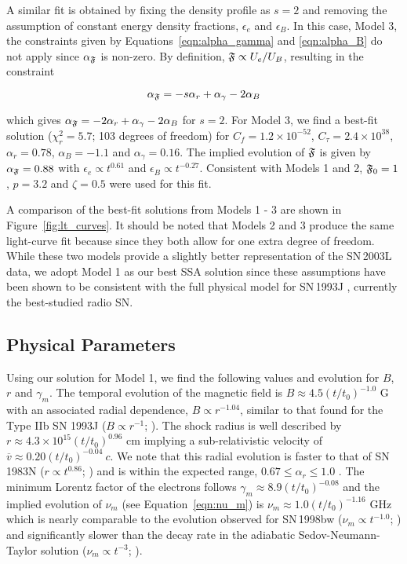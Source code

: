 \documentclass[12pt,preprint]{aastex}
\begin{document}
A similar fit is obtained by fixing the density profile as $s=2$ and
removing the assumption of constant energy density fractions,
$\epsilon_e$ and $\epsilon_B$.  In this case, Model 3, the constraints
given by Equations~\ref{eqn:alpha_gamma} and \ref{eqn:alpha_B} do not
apply since $\alpha_{\frak{F}}$ is non-zero.  By definition, $\frak{F} \propto
U_e/U_B$, resulting in the constraint

\begin{equation}
\alpha_{\frak{F}}=-s\alpha_r + \alpha_{\gamma} -2\alpha_B
\label{eqn:alpha_frak} 
\end{equation}

\noindent
which gives $\alpha_{\frak{F}}=-2\alpha_r +\alpha_{\gamma}-2\alpha_B$
for $s=2$.  For Model 3, we find a best-fit solution ($\chi^2_r=5.7$;
103 degrees of freedom) for $C_f=1.2\times 10^{-52}$,
$C_{\tau}=2.4\times 10^{38}$, $\alpha_r=0.78$, $\alpha_B=-1.1$ and
$\alpha_{\gamma}=0.16$.  The implied evolution of $\frak{F}$ is given
by $\alpha_{\frak{F}}=0.88$ with $\epsilon_e \propto t^{0.61}$ and
$\epsilon_B \propto t^{-0.27}$.  Consistent with Models 1 and 2,
$\frak{F}_0=1$, $p=3.2$ and $\zeta=0.5$ were used for this fit.  

A comparison of the best-fit solutions from Models 1 - 3 are shown in
Figure~\ref{fig:lt_curves}.  It should be noted that Models 2 and 3
produce the same light-curve fit because since they both allow for one
extra degree of freedom.  While these two models provide a slightly
better representation of the SN\,2003L data, we adopt Model 1 as our
best SSA solution since these assumptions have been shown to be
consistent with the full physical model for SN\,1993J \citep{fb98},
currently the best-studied radio SN.

\subsection{Physical Parameters}
\label{sec:phys_params}
Using our solution for Model 1, we find the following values and
evolution for $B$, $r$ and $\gamma_m$.  The temporal evolution of the
magnetic field is $B\approx 4.5 (t/t_0)^{-1.0}$ G with an associated
radial dependence, $B\propto r^{-1.04}$, similar to that found for the
Type IIb SN 1993J ($B\propto r^{-1}$; \citealt{fb98}).  The shock
radius is well described by $r\approx 4.3\times 10^{15}
(t/t_0)^{0.96}$ cm implying a sub-relativistic velocity of
$\overline{v} \approx 0.20 (t/t_0)^{-0.04}~c$.  We note that this
radial evolution is faster to that of SN\,1983N ($r \propto
t^{0.86}$; \citealt{c98}) and is within the expected range, $0.67 \le
\alpha_r \le 1.0$ \citep{c96,c98}.  The minimum Lorentz factor of the
electrons follows $\gamma_m \approx 8.9 (t/t_0)^{-0.08}$ and the
implied evolution of $\nu_m$ (see Equation~\ref{eqn:nu_m}) is
$\nu_m\approx 1.0 (t/t_0)^{-1.16}$ GHz which is nearly comparable to the
evolution observed for SN\,1998bw ($\nu_m \propto t^{-1.0}$;
\citealt{lc99}) and significantly slower than the decay rate in the
adiabatic Sedov-Neumann-Taylor solution ($\nu_m \propto t^{-3}$;
\citealt{zr02,fwk00}).
\end{document}
